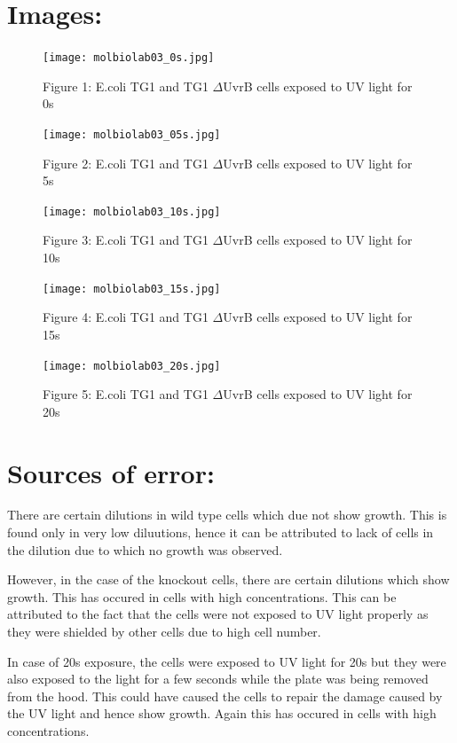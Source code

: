\documentclass{report}
\begin{document}
\section*{Images:}

\begin{figure}[!ht]
    \centering
    \texttt{[image: molbiolab03\_0s.jpg]}
    \caption*{Figure 1: E.coli TG1 and TG1 $\Delta$UvrB cells exposed to UV light for 0s}
\end{figure}

\begin{figure}[!ht]
    \centering
    \texttt{[image: molbiolab03\_05s.jpg]}
    \caption*{Figure 2: E.coli TG1 and TG1 $\Delta$UvrB cells exposed to UV light for 5s}
\end{figure}

\begin{figure}[!ht]
    \centering
    \texttt{[image: molbiolab03\_10s.jpg]}
    \caption*{Figure 3: E.coli TG1 and TG1 $\Delta$UvrB cells exposed to UV light for 10s}
\end{figure}

\begin{figure}[!ht]
    \centering
    \texttt{[image: molbiolab03\_15s.jpg]}
    \caption*{Figure 4: E.coli TG1 and TG1 $\Delta$UvrB cells exposed to UV light for 15s}
\end{figure}

\begin{figure}[!ht]
    \centering
    \texttt{[image: molbiolab03\_20s.jpg]}
    \caption*{Figure 5: E.coli TG1 and TG1 $\Delta$UvrB cells exposed to UV light for 20s}
\end{figure}



\section*{Sources of error:}

There are certain dilutions in wild type cells which due not show growth.
This is found only in very low diluutions, hence it can be attributed to lack of cells in the dilution due to which no growth was observed.

However, in the case of the knockout cells, there are certain dilutions which show growth.
This has occured in cells with high concentrations. This can be attributed to the fact that the cells were not exposed to UV light properly as they 
were shielded by other cells due to high cell number.

In case of 20s exposure, the cells were exposed to UV light for 20s but they were also exposed to the light for a few seconds while the plate was being removed from the hood.
This could have caused the cells to repair the damage caused by the UV light and hence show growth. Again this has occured in cells with high concentrations.
\end{document}
